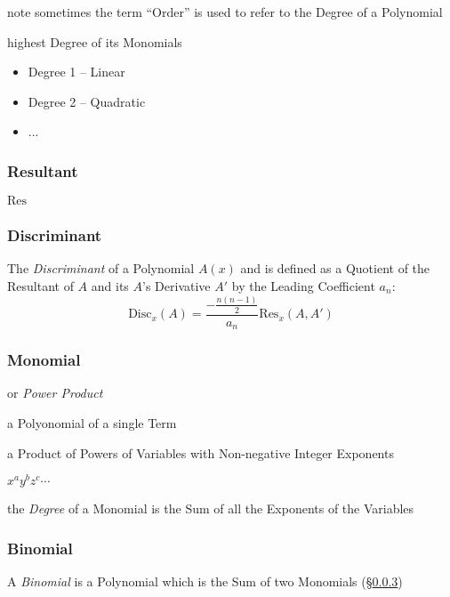 note sometimes the term ``Order'' is used to refer to the Degree of a
Polynomial

highest Degree of its Monomials

\begin{itemize}
  \item Degree 1 -- Linear
  \item Degree 2 -- Quadratic
  \item ...
\end{itemize}



\subsubsection{Resultant}\label{sec:resultant}

$\mathrm{Res}$



\subsubsection{Discriminant}\label{sec:discriminant}

The \emph{Discriminant} of a Polynomial $A(x)$ and is defined as a Quotient of
the Resultant of $A$ and its $A$'s Derivative $A'$ by the Leading Coefficient
$a_n$:
\[
  \mathrm{Disc}_x(A) = \frac{-\frac{n(n-1)}{2}}{a_n} \mathrm{Res}_x(A, A')
\]



\subsubsection{Monomial}\label{sec:monomial}

or \emph{Power Product}

a Polyonomial of a single Term

a Product of Powers of Variables with Non-negative Integer Exponents

$x^a y^b z^c \cdots$

the \emph{Degree} of a Monomial is the Sum of all the Exponents of the
Variables



\subsubsection{Binomial}\label{sec:binomial}

A \emph{Binomial} is a Polynomial which is the Sum of two Monomials
(\S\ref{sec:monomial})

